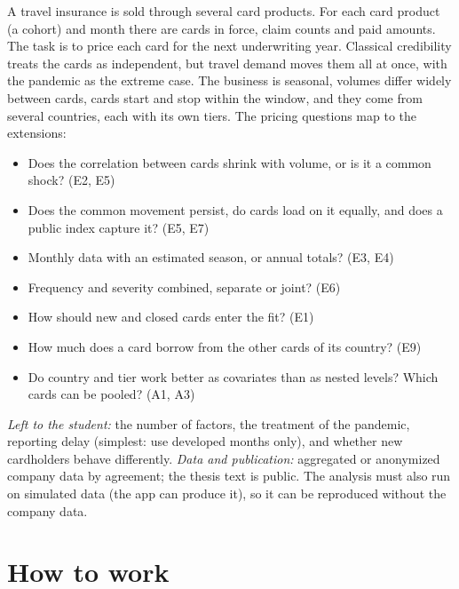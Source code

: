 \documentclass[10pt]{article}
\begin{document}
A travel insurance is sold through several card products. For each card product (a cohort) and
month there are cards in force, claim counts and paid amounts. The task is to price each card for
the next underwriting year. Classical credibility treats the cards as independent, but travel
demand moves them all at once, with the pandemic as the extreme case. The business is seasonal,
volumes differ widely between cards, cards start and stop within the window, and they come from
several countries, each with its own tiers. The pricing questions map to the extensions:
\begin{itemize}\setlength{\itemsep}{1pt}
  \item Does the correlation between cards shrink with volume, or is it a common shock? (E2, E5)
  \item Does the common movement persist, do cards load on it equally, and does a public index
    capture it? (E5, E7)
  \item Monthly data with an estimated season, or annual totals? (E3, E4)
  \item Frequency and severity combined, separate or joint? (E6)
  \item How should new and closed cards enter the fit? (E1)
  \item How much does a card borrow from the other cards of its country? (E9)
  \item Do country and tier work better as covariates than as nested levels? Which cards can be
    pooled? (A1, A3)
\end{itemize}
\textit{Left to the student:} the number of factors, the treatment of the pandemic, reporting delay
(simplest: use developed months only), and whether new cardholders behave differently.
\textit{Data and publication:} aggregated or anonymized company data by agreement; the thesis text
is public. The analysis must also run on simulated data (the app can produce it), so it can be
reproduced without the company data.

\section{How to work}
\end{document}
